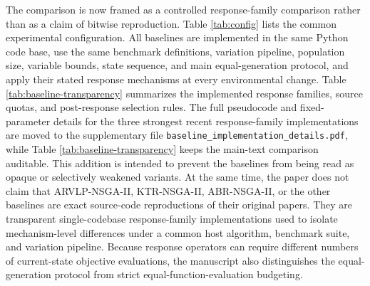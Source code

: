 \documentclass[1p,times]{elsarticle}
\begin{document}
The comparison is now framed as a controlled response-family comparison rather than as a claim of bitwise reproduction. Table \ref{tab:config} lists the common experimental configuration.  All baselines are implemented in the same Python code base, use the same benchmark definitions, variation pipeline, population size, variable bounds, state sequence, and main equal-generation protocol, and apply their stated response mechanisms at every environmental change. Table \ref{tab:baseline-transparency} summarizes the implemented response families, source quotas, and post-response selection rules. The full pseudocode and fixed-parameter details for the three strongest recent response-family implementations are moved to the supplementary file \texttt{baseline\_implementation\_details.pdf}, while Table \ref{tab:baseline-transparency} keeps the main-text comparison auditable. This addition is intended to prevent the baselines from being read as opaque or selectively weakened variants. At the same time, the paper does not claim that ARVLP-NSGA-II, KTR-NSGA-II, ABR-NSGA-II, or the other baselines are exact source-code reproductions of their original papers. They are transparent single-codebase response-family implementations used to isolate mechanism-level differences under a common host algorithm, benchmark suite, and variation pipeline. Because response operators can require different numbers of current-state objective evaluations, the manuscript also distinguishes the equal-generation protocol from strict equal-function-evaluation budgeting.


\end{document}
